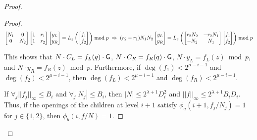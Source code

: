 \begin{proof}
\begin{proof}
\begin{equation*}
\begin{bmatrix}
N_1 & 0 \\
0 & N_2 \\
\end{bmatrix} 
\begin{bmatrix}
1 & r_1 \\
1 & r_2 \\
\end{bmatrix} 
\begin{bmatrix}
y_L \\
y_R \\
\end{bmatrix} 
= 
L_z \left(
\begin{bmatrix}
f_1 \\
f_2\\
\end{bmatrix}
\right) \bmod p
\hspace{1mm}
\Rightarrow
\hspace{1mm}
(r_2 - r_1) N_1 N_2 
\begin{bmatrix}
y_L \\
y_R \\
\end{bmatrix}
= 
L_z \left(
\begin{bmatrix}
r_2 N_2 & -r_2 N_1 \\
-N_2 & N_1 \\
\end{bmatrix}
\begin{bmatrix}
f_1 \\
f_2 \\
\end{bmatrix}
\right)
\bmod p
\end{equation*} 

This shows that $N \cdot C_L = f_L(q) \cdot \gr{G}$, $N \cdot C_R = f_R(q) \cdot \gr{G}$, $N \cdot y_L = f_L(z) \bmod p$, and $N \cdot y_R = f_R(z) \bmod p$. Furthermore, if $\deg(f_1) < 2^{\mu - i - 1}$ and $\deg(f_2) < 2^{\mu - i - 1}$, then $\deg(f_L) < 2^{\mu - i-1}$ and $\deg(f_R) < 2^{\mu -i -1}$. 


If $\forall _j ||f_j||_\infty \leq B_i$ and $\forall_j |N_j| \leq B_i$,  then $|N|  \leq 2^{\lambda + 1} D_i^2$ and $||f||_\infty \leq 2^{\lambda + 1} B_i D_i$. Thus, if the openings of the children at level $i+1$ satisfy $\phi_a(i+1, f_j/N_j) = 1$ for $j \in \{1, 2\}$, then $\phi_b(i, f/N) = 1$. %
\end{proof} 




\end{proof}
